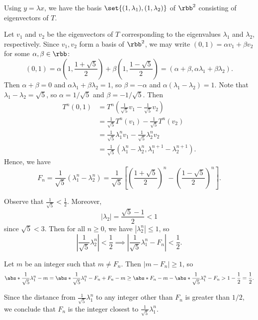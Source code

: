 \begin{solenum}
    Using $y = \lambda x$, we have the basis $\set{(1, \lambda_1), (1, \lambda_2)}$ of $\rbb^2$ consisting of eigenvectors of $T$.
    \item Let $v_1$ and $v_2$ be the eigenvectors of $T$ corresponding to the eigenvalues $\lambda_1$ and $\lambda_2$, respectively.
    Since $v_1, v_2$ form a basis of $\rbb^2$, we may write $(0, 1) = \alpha v_1 + \beta v_2$ for some $\alpha, \beta \in \rbb$:
    \[
        (0, 1) = \alpha\left(1, \frac{1 + \sqrt{5}}{2}\right) + \beta\left(1, \frac{1 - \sqrt{5}}{2}\right) = (\alpha + \beta, \alpha\lambda_1 + \beta\lambda_2).
    \]
    Then $\alpha + \beta = 0$ and $\alpha\lambda_1 + \beta\lambda_2 = 1$, so $\beta = -\alpha$ and $\alpha(\lambda_1 - \lambda_2) = 1$.
    Note that $\lambda_1 - \lambda_2 = \sqrt{5}$, so $\alpha = 1/\sqrt{5}$ and $\beta = -1/\sqrt{5}$.
    Then
    \begin{align*}
        T^n(0, 1) &= T^n\left(\frac{1}{\sqrt{5}}v_1 - \frac{1}{\sqrt{5}}v_2\right) \\
        &= \frac{1}{\sqrt{5}}T^n(v_1) - \frac{1}{\sqrt{5}}T^n(v_2) \\
        &= \frac{1}{\sqrt{5}}\lambda_1^n v_1 - \frac{1}{\sqrt{5}}\lambda_2^n v_2 \\
        &= \frac{1}{\sqrt{5}}\left(\lambda_1^n - \lambda_2^n, \lambda_1^{n+1} - \lambda_2^{n+1}\right).
    \end{align*}
    Hence, we have
    \[
        F_n = \frac{1}{\sqrt{5}}\left(\lambda_1^n - \lambda_2^n\right) = \frac{1}{\sqrt{5}}\left[\left(\frac{1 + \sqrt{5}}{2}\right)^n - \left(\frac{1 - \sqrt{5}}{2}\right)^n\right].
    \]
    \item Observe that $\frac{1}{\sqrt 5} < \frac{1}{2}$. Moreover,
    \[
        |\lambda_2| = \frac{\sqrt{5} - 1}{2} < 1
    \]
    since $\sqrt{5} < 3$.
    Then for all $n \geq 0$, we have $|\lambda_2^n| \leq 1$, so
    \[
        \left|\frac{1}{\sqrt{5}}\lambda_2^n\right| < \frac{1}{2} \implies \left|\frac{1}{\sqrt{5}}\lambda_1^n - F_n\right| < \frac{1}{2}.
    \]
    
    Let $m$ be an integer such that $m \neq F_n$.
    Then $|m - F_n| \geq 1$, so
    \[
        \abs*{\frac{1}{\sqrt 5}\lambda_1^n - m} = \abs*{\frac{1}{\sqrt 5}\lambda_1^n - F_n + F_n - m} \geq \abs*{F_n - m} - \abs*{\frac{1}{\sqrt 5}\lambda_1^n - F_n} > 1 - \frac{1}{2} = \frac{1}{2}.
    \]

    Since the distance from $\frac{1}{\sqrt 5}\lambda_1^n$ to any integer other than $F_n$ is greater than $1/2$, we conclude that $F_n$ is the integer closest to $\frac{1}{\sqrt 5}\lambda_1^n$.
\end{solenum}

